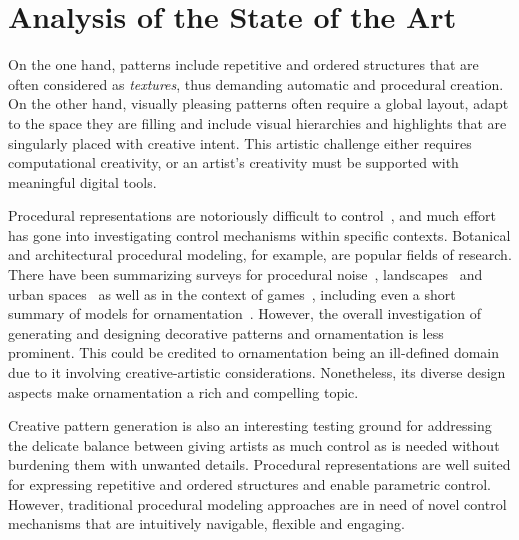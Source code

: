 

\section{Analysis of the State of the Art}
\label{sec:analysis}



On the one hand, patterns include repetitive and ordered structures that are often considered as \textit{textures}, thus demanding automatic and procedural creation. On the other hand, visually pleasing patterns often require a global layout, adapt to the space they are filling and include visual hierarchies and highlights that are singularly placed with creative intent. This artistic challenge either requires computational creativity, or an artist’s creativity must be supported with meaningful digital tools.

Procedural representations are notoriously difficult to control~\cite{bourque_2004_ptm,lagae_2010_pis,gilet_2010_ias,benes_2011_gpm,lasram_2012_ssf,lasram_2012_ptp}, and
much effort has gone into investigating control mechanisms within specific contexts. Botanical and architectural procedural modeling, for example, are popular fields of research. There have been summarizing surveys for procedural noise~\cite{lagae_2010_sap}, landscapes~\cite{smelik_2014_aso} and urban spaces~\cite{vanegas_2009_mab} as well as in the context of games~\cite{hendrikx_2013_pcg, togelius_2011_sbp}, including even a short summary of models for ornamentation~\cite{whitehead_2010_tpd}. However, the overall investigation of generating and designing decorative patterns and ornamentation is less prominent. This could be credited to ornamentation being an ill-defined domain due to it involving creative-artistic considerations. Nonetheless, its diverse design aspects make ornamentation a rich and compelling topic.


Creative pattern generation is also an interesting testing ground for addressing the delicate balance between giving artists as much control as is needed without burdening them with unwanted details. Procedural representations are well suited for expressing repetitive and ordered structures and enable parametric control. However, traditional procedural modeling approaches are in need of novel control mechanisms that are intuitively navigable, flexible and engaging.

